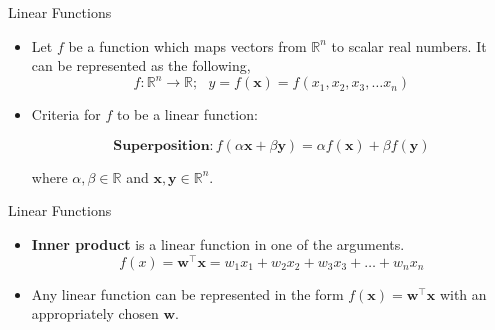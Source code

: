 \documentclass[aspectratio=169]{beamer}
\let\olditem\item
\renewcommand{\item}{\setlength{\itemsep}{\fill}\olditem}
\begin{document}
  
  \begin{frame}[t]{Linear Functions}
  \begin{itemize}
  \item Let $f$ be a function which maps vectors from $\mathbb{R}^n$ to scalar real numbers. It can be represented as the following,
  $$f: \mathbb{R}^n \longrightarrow \mathbb{R}; \,\,\,\, y = f(\mathbf{x}) = f\left(x_1, x_2, x_3, \ldots x_n\right)$$
  
  \item Criteria for $f$ to be a linear function:
  
  $$ \textbf{Superposition}: f\left(\alpha \mathbf{x} + \beta \mathbf{y}\right) = \alpha f\left(\mathbf{x}\right) + \beta f\left(\mathbf{y}\right) $$
  
  where $\alpha, \beta \in \mathbb{R}$ and $\mathbf{x}, \mathbf{y} \in \mathbb{R}^n$.
  \end{itemize}
  \end{frame}
  
  
  
  \begin{frame}[t]{Linear Functions}
  \begin{itemize}
  \item \textbf{Inner product} is a linear function in one of the arguments. $$f\left(x\right) = \mathbf{w}^\top\mathbf{x} = w_1x_1 + w_2x_2 + w_3x_3 + \ldots + w_nx_n$$
  \item Any linear function can be represented in the form $f\left(\mathbf{x}\right) = \mathbf{w}^\top\mathbf{x}$ with an appropriately chosen $\mathbf{w}$.
  \end{itemize}
  \end{frame}
  
\end{document}
